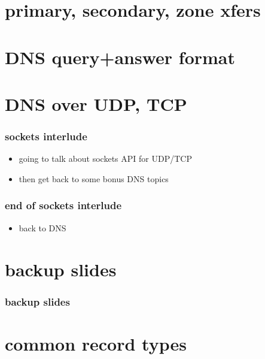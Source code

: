 \section{primary, secondary, zone xfers}

\section{DNS query+answer format}


\section{DNS over UDP, TCP}


\begin{frame}
\frametitle{sockets interlude}
    \begin{itemize}
    \item going to talk about sockets API for UDP/TCP
    \item then get back to some bonus DNS topics
    \end{itemize}
\end{frame}



\begin{frame}
\frametitle{end of sockets interlude}
    \begin{itemize}
        \item back to DNS
    \end{itemize}
\end{frame}





\section{backup slides}
\begin{frame}\frametitle{backup slides}
\end{frame}
\section{common record types}



